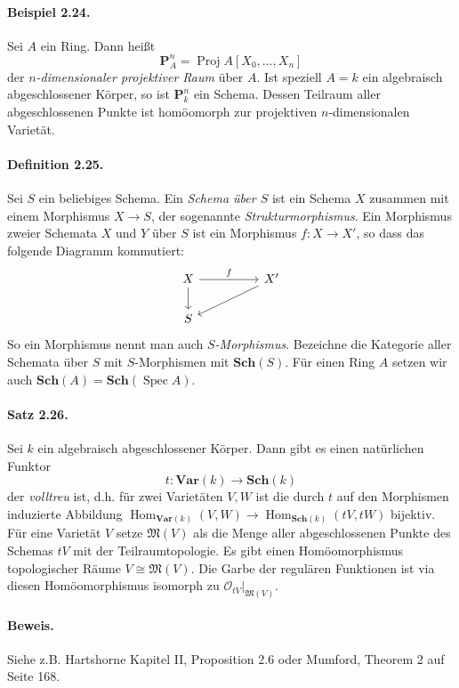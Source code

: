 \paragraph{Beispiel 2.24.}\label{2.24} Sei $A$ ein Ring. Dann heißt
\[\mathbf{P}_A^n = \operatorname{Proj} A[X_0,\ldots,X_n] \]
der \textit{$n$-dimensionaler projektiver Raum} über $A$. Ist speziell $A=k$ ein algebraisch abgeschlossener Körper, so ist $\mathbf{P}_k^n$ ein Schema. Dessen Teilraum aller abgeschlossenen Punkte ist homöomorph zur projektiven $n$-dimensionalen Varietät.

\paragraph{Definition 2.25.} \label{2.25} Sei $S$ ein beliebiges Schema. Ein \textit{Schema über $S$} ist ein Schema $X$ zusammen mit einem Morphismus $X\to S$, der sogenannte \textit{Strukturmorphismus}. Ein Morphismus zweier Schemata $X$ und $Y$ über $S$ ist ein Morphismus $f:X\to X'$, so dass das folgende Diagramm kommutiert:
\[\begin{tikzcd}
X\ar[rr, "f"]\ar[d] && X'\ar[lld]\\
S
\end{tikzcd} \]
So ein Morphismus nennt man auch \textit{$S$-Morphismus}. Bezeichne die Kategorie aller Schemata über $S$ mit $S$-Morphismen mit $\mathbf{Sch}(S)$. Für einen Ring $A$ setzen wir auch $\mathbf{Sch}(A)=\mathbf{Sch}(\operatorname{Spec}A)$.

\paragraph{Satz 2.26.}\label{2.26} Sei $k$ ein algebraisch abgeschlossener Körper. Dann gibt es einen natürlichen Funktor
\[t:\mathbf{Var}(k)\to\mathbf{Sch}(k) \]
der \textit{volltreu} ist, d.h. für zwei Varietäten $V,W$ ist die durch $t$ auf den Morphismen induzierte Abbildung $\operatorname{Hom}_{\mathbf{Var}(k)}(V,W)\to \operatorname{Hom}_{\mathbf{Sch}(k)}(tV,tW)$ bijektiv. Für eine Varietät $V$ setze $\mathfrak{M}(V)$ als die Menge aller abgeschlossenen Punkte des Schemas $tV$ mit der Teilraumtopologie. Es gibt einen Homöomorphismus topologischer Räume $V\cong\mathfrak{M}(V)$. Die Garbe der regulären Funktionen ist via diesen Homöomorphismus isomorph zu $\mathcal{O}_{tV}|_{\mathfrak{M}(V)}$.

\paragraph{Beweis.} Siehe z.B. Hartshorne Kapitel II, Proposition 2.6 oder Mumford, Theorem 2 auf Seite 168.

